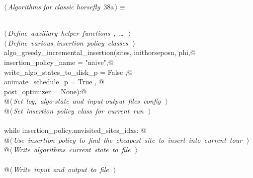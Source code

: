 \documentclass[11.5pt]{report}
\begin{document}
\begin{flushleft} \small\label{scrap47}\raggedright\small
{} $\langle\,${\itshape Algorithms for classic horsefly}\nobreak\ {\footnotesize {38a}}$\,\rangle\equiv$
\vspace{-1ex}
\begin{list}{}{} \item
\mbox{}\verb@@\\
\mbox{}\verb@@\hbox{$\langle\,${\itshape Define auxiliary helper functions}\nobreak\ {\footnotesize {}, \ldots\ }$\,\rangle$}\verb@@\\
\mbox{}\verb@@\hbox{$\langle\,${\itshape Define various insertion policy classes}\nobreak\ {\footnotesize {}}$\,\rangle$}\verb@@\\
\mbox{}\verb@def algo_greedy_incremental_insertion(sites, inithorseposn, phi,@\\
\mbox{}\verb@                                      insertion_policy_name       = "naive",@\\
\mbox{}\verb@                                      write_algo_states_to_disk_p = False   ,@\\
\mbox{}\verb@                                      animate_schedule_p          = True   , @\\
\mbox{}\verb@                                      post_optimizer              = None):@\\
\mbox{}\verb@      @\hbox{$\langle\,${\itshape Set log, algo-state and input-output files config}\nobreak\ {\footnotesize {}}$\,\rangle$}\verb@@\\
\mbox{}\verb@      @\hbox{$\langle\,${\itshape Set insertion policy class for current run}\nobreak\ {\footnotesize {}}$\,\rangle$}\verb@@\\
\mbox{}\verb@@\\
\mbox{}\verb@      while insertion_policy.unvisited_sites_idxs: @\\
\mbox{}\verb@         @\hbox{$\langle\,${\itshape Use insertion policy to find the cheapest site to insert into current tour}\nobreak\ {\footnotesize {}}$\,\rangle$}\verb@@\\
\mbox{}\verb@         @\hbox{$\langle\,${\itshape Write algorithms current state to file}\nobreak\ {\footnotesize {}}$\,\rangle$}\verb@@\\
\mbox{}\verb@@\\
\mbox{}\verb@      @\hbox{$\langle\,${\itshape Write input and output to file}\nobreak\ {\footnotesize {}}$\,\rangle$}\verb@@\\

\end{list}
\end{flushleft}
\end{document}
